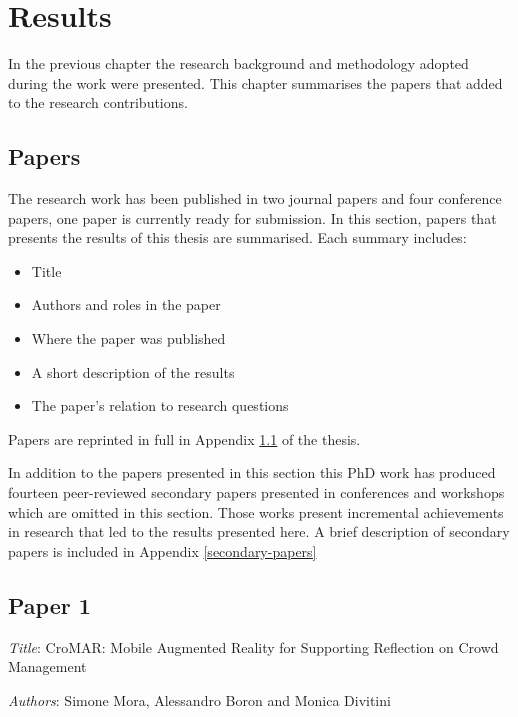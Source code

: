 \chapter{Results}\label{results}


In the previous chapter the research background and methodology adopted during the work were presented. This chapter summarises the papers that added to the research contributions.

\section{Papers}\label{papers}

The research work has been published in two journal papers and four conference papers, one paper is currently ready for submission. In this section, papers that presents the results of this thesis are summarised. Each summary includes:
\begin{itemize}
	\itemsep1pt\parskip0pt 
	\item Title 
	\item Authors and roles in the paper 
	\item Where the paper was published 
	\item A short description of the results 
	\item The paper's relation to research questions 
\end{itemize}

Papers are reprinted in full in Appendix \ref{papers} of the thesis.

In addition to the papers presented in this section this PhD work has produced fourteen peer-reviewed secondary papers presented in conferences and workshops which are omitted in this section. Those works present incremental achievements in research that led to the results presented here. A brief description of secondary papers is included in Appendix \ref{secondary-papers}

\section[CroMAR: Mobile Augmented Reality for Supporting Reflection on Crowd Management]{Paper 1} \label{paper-1}

\emph{Title}: CroMAR: Mobile Augmented Reality for Supporting Reflection on Crowd Management

\emph{Authors}: Simone Mora, Alessandro Boron and Monica Divitini

